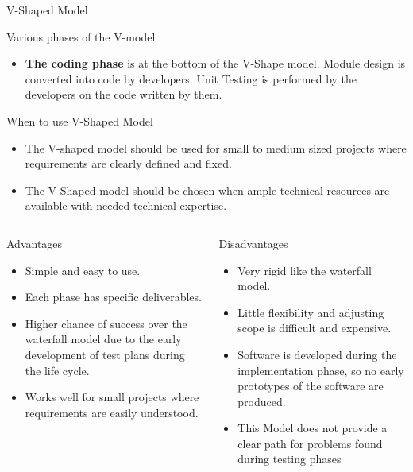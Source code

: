 \documentclass[final,hyperref={pdfpagelabels=false}]{beamer}
\begin{document}
\begin{frame}{V-Shaped Model}
\begin{block}{\large Various phases of the V-model }
\begin{itemize}
            \item \textbf{ The coding phase} is at the bottom of the V-Shape model. Module design is converted into code by developers. Unit Testing is performed by the developers on the code written by them.
        \end{itemize}
    \end{block}  
     \begin{block}{\large When to use V-Shaped Model}
        \centering
        \begin{itemize}
            \item The V-shaped model should be used for small to medium sized projects where requirements are clearly defined and fixed.
            \item The V-Shaped model should be chosen when ample technical resources are available with needed technical expertise.
        \end{itemize}
    \end{block}  
    \begin{columns}[t]
      \begin{column}{.48\linewidth}
        \begin{block}{Advantages}
          \begin{itemize}
          \item Simple and easy to use.
          \item Each phase has specific deliverables.
          \item Higher chance of success over the waterfall model
                due to the early development of test plans during the
                life cycle.
          \item Works well for small projects where requirements are
                easily understood.
          \end{itemize}
        \end{block}
      \end{column}
      \begin{column}{.48\linewidth}
        \begin{block}{Disadvantages}
          \begin{itemize}
          \item Very rigid like the waterfall model.
          \item Little flexibility and adjusting scope is difficult and
                expensive.
          \item Software is developed during the implementation phase,
                so no early prototypes of the software are produced.
          \item This Model does not provide a clear path for problems
                found during testing phases
          \end{itemize}
        \end{block}
      \end{column}
    \end{columns}
  \end{frame}
\end{document}
